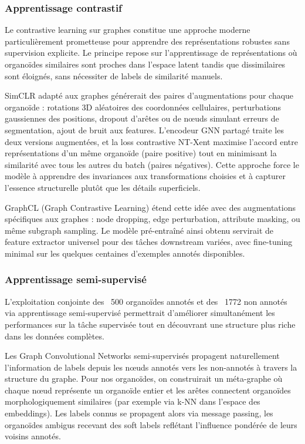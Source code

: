 \subsubsection{Apprentissage contrastif}

Le contrastive learning sur graphes constitue une approche moderne particulièrement prometteuse pour apprendre des représentations robustes sans supervision explicite. Le principe repose sur l'apprentissage de représentations où organoïdes similaires sont proches dans l'espace latent tandis que dissimilaires sont éloignés, sans nécessiter de labels de similarité manuels.

SimCLR adapté aux graphes générerait des paires d'augmentations pour chaque organoïde : rotations 3D aléatoires des coordonnées cellulaires, perturbations gaussiennes des positions, dropout d'arêtes ou de nœuds simulant erreurs de segmentation, ajout de bruit aux features. L'encodeur GNN partagé traite les deux versions augmentées, et la loss contrastive NT-Xent maximise l'accord entre représentations d'un même organoïde (paire positive) tout en minimisant la similarité avec tous les autres du batch (paires négatives). Cette approche force le modèle à apprendre des invariances aux transformations choisies et à capturer l'essence structurelle plutôt que les détails superficiels.

GraphCL (Graph Contrastive Learning) étend cette idée avec des augmentations spécifiques aux graphes : node dropping, edge perturbation, attribute masking, ou même subgraph sampling. Le modèle pré-entraîné ainsi obtenu servirait de feature extractor universel pour des tâches downstream variées, avec fine-tuning minimal sur les quelques centaines d'exemples annotés disponibles.

\subsubsection{Apprentissage semi-supervisé}

L'exploitation conjointe des ~500 organoïdes annotés et des ~1772 non annotés via apprentissage semi-supervisé permettrait d'améliorer simultanément les performances sur la tâche supervisée tout en découvrant une structure plus riche dans les données complètes.

Les Graph Convolutional Networks semi-supervisés propagent naturellement l'information de labels depuis les nœuds annotés vers les non-annotés à travers la structure du graphe. Pour nos organoïdes, on construirait un méta-graphe où chaque nœud représente un organoïde entier et les arêtes connectent organoïdes morphologiquement similaires (par exemple via k-NN dans l'espace des embeddings). Les labels connus se propagent alors via message passing, les organoïdes ambigus recevant des soft labels reflétant l'influence pondérée de leurs voisins annotés.

